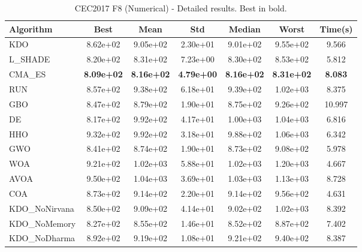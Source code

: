\begin{table}[H]
\centering\small
\caption{CEC2017 F8 (Numerical) - Detailed results. Best in bold.}
\label{tab:cec2017_F8}
\begin{tabular}{lcccccc}
\toprule
\textbf{Algorithm} & \textbf{Best} & \textbf{Mean} & \textbf{Std} & \textbf{Median} & \textbf{Worst} & \textbf{Time(s)} \\
\midrule
KDO & 8.62e+02 & 9.05e+02 & 2.30e+01 & 9.01e+02 & 9.55e+02 & 9.566 \\
L_SHADE & 8.20e+02 & 8.31e+02 & 7.23e+00 & 8.30e+02 & 8.53e+02 & 5.812 \\
CMA_ES & \textbf{8.09e+02} & \textbf{8.16e+02} & \textbf{4.79e+00} & \textbf{8.16e+02} & \textbf{8.31e+02} & \textbf{8.083} \\
RUN & 8.57e+02 & 9.38e+02 & 6.18e+01 & 9.39e+02 & 1.02e+03 & 8.375 \\
GBO & 8.47e+02 & 8.79e+02 & 1.90e+01 & 8.75e+02 & 9.26e+02 & 10.997 \\
DE & 8.17e+02 & 9.92e+02 & 4.17e+01 & 1.00e+03 & 1.04e+03 & 6.816 \\
HHO & 9.32e+02 & 9.92e+02 & 3.18e+01 & 9.88e+02 & 1.06e+03 & 6.342 \\
GWO & 8.41e+02 & 8.74e+02 & 1.90e+01 & 8.73e+02 & 9.08e+02 & 5.978 \\
WOA & 9.21e+02 & 1.02e+03 & 5.88e+01 & 1.02e+03 & 1.20e+03 & 4.667 \\
AVOA & 9.50e+02 & 1.04e+03 & 3.69e+01 & 1.03e+03 & 1.13e+03 & 8.728 \\
COA & 8.73e+02 & 9.14e+02 & 2.20e+01 & 9.14e+02 & 9.56e+02 & 4.631 \\
KDO_NoNirvana & 8.50e+02 & 9.09e+02 & 4.14e+01 & 9.02e+02 & 1.02e+03 & 8.392 \\
KDO_NoMemory & 8.27e+02 & 8.55e+02 & 1.46e+01 & 8.52e+02 & 8.87e+02 & 7.402 \\
KDO_NoDharma & 8.92e+02 & 9.19e+02 & 1.08e+01 & 9.21e+02 & 9.40e+02 & 8.387 \\
\bottomrule
\end{tabular}
\end{table}

